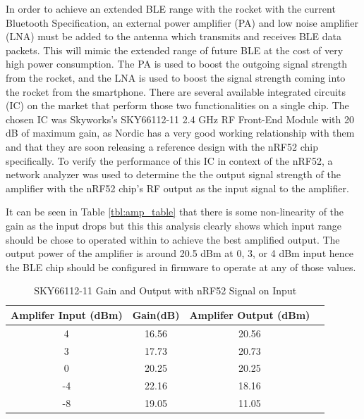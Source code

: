 \documentclass{workreport}
\begin{document}
\begin{body}
	In order to achieve an extended BLE range with the rocket with the current Bluetooth Specification, an external power amplifier (PA) and low noise amplifier (LNA) must be added to the antenna which transmits and receives BLE data packets. This will mimic the extended range of future BLE at the cost of very high power consumption. The PA is used to boost the outgoing signal strength from the rocket, and the LNA is used to boost the signal strength coming into the rocket from the smartphone. There are several available integrated circuits (IC) on the market that perform those two functionalities on a single chip. The chosen IC was Skyworks's SKY66112-11 2.4 GHz RF Front-End Module with 20 dB of maximum gain, as Nordic has a very good working relationship with them and that they are soon releasing a reference design with the nRF52 chip specifically. To verify the performance of this IC in context of the nRF52, a network analyzer was used to determine the the output signal strength of the amplifier with the nRF52 chip's RF output as the input signal to the amplifier.

	It can be seen in Table \ref{tbl:amp_table} that there is some non-linearity of the gain as the input drops but this this analysis clearly shows which input range should be chose to operated within to achieve the best amplified output. The output power of the amplifier is around 20.5 dBm at 0, 3, or 4 dBm input hence the BLE chip should be configured in firmware to operate at any of those values.

\begin{table}

	\centering

	\begin{tabular}{|c|c|c|c|} \hline
		Amplifer Input (dBm) & Gain(dB) & Amplifer Output (dBm) \\ \hline
		4 & 16.56 & 20.56 \\ \hline
		3  & 17.73 & 20.73 \\ \hline
		0  & 20.25 & 20.25 \\ \hline
		-4  & 22.16 & 18.16 \\ \hline
		-8  & 19.05 & 11.05 \\ \hline
	\end{tabular}
	\caption{SKY66112-11 Gain and Output with nRF52 Signal on Input}


\end{table}
\end{body}
\end{document}
